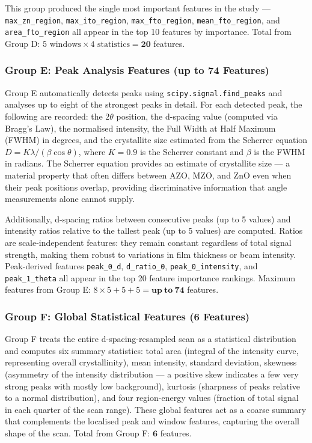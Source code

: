 \documentclass[12pt, oneside]{article} %
\begin{document}
This group produced the single most important features in the study --- \texttt{max\_zn\_region}, \texttt{max\_ito\_region}, \texttt{max\_fto\_region}, \texttt{mean\_fto\_region}, and \texttt{area\_fto\_region} all appear in the top 10 features by importance. Total from Group D: $5 \text{ windows} \times 4 \text{ statistics} = \mathbf{20}$ features.

\subsubsection{Group E: Peak Analysis Features (up to 74 Features)}

Group E automatically detects peaks using \texttt{scipy.signal.find\_peaks} and analyses up to eight of the strongest peaks in detail. For each detected peak, the following are recorded: the $2\theta$ position, the d-spacing value (computed via Bragg's Law), the normalised intensity, the Full Width at Half Maximum (FWHM) in degrees, and the crystallite size estimated from the Scherrer equation $D = K\lambda / (\beta \cos\theta)$, where $K = 0.9$ is the Scherrer constant and $\beta$ is the FWHM in radians. The Scherrer equation provides an estimate of crystallite size --- a material property that often differs between AZO, MZO, and ZnO even when their peak positions overlap, providing discriminative information that angle measurements alone cannot supply.

Additionally, d-spacing ratios between consecutive peaks (up to 5 values) and intensity ratios relative to the tallest peak (up to 5 values) are computed. Ratios are scale-independent features: they remain constant regardless of total signal strength, making them robust to variations in film thickness or beam intensity. Peak-derived features \texttt{peak\_0\_d}, \texttt{d\_ratio\_0}, \texttt{peak\_0\_intensity}, and \texttt{peak\_1\_theta} all appear in the top 20 feature importance rankings. Maximum features from Group E: $8 \times 5 + 5 + 5 = \mathbf{up\ to\ 74}$ features.

\subsubsection{Group F: Global Statistical Features (6 Features)}

Group F treats the entire d-spacing-resampled scan as a statistical distribution and computes six summary statistics: total area (integral of the intensity curve, representing overall crystallinity), mean intensity, standard deviation, skewness (asymmetry of the intensity distribution --- a positive skew indicates a few very strong peaks with mostly low background), kurtosis (sharpness of peaks relative to a normal distribution), and four region-energy values (fraction of total signal in each quarter of the scan range). These global features act as a coarse summary that complements the localised peak and window features, capturing the overall shape of the scan. Total from Group F: $\mathbf{6}$ features.
\end{document}
